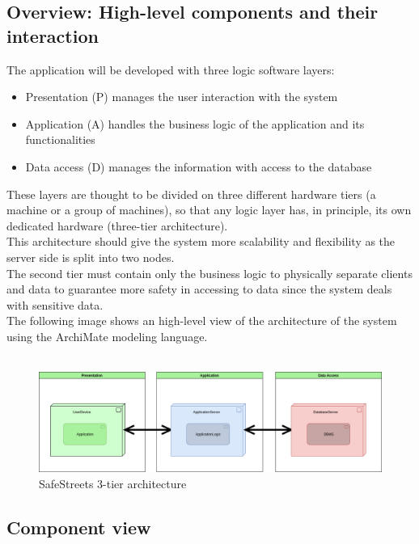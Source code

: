 \documentclass{article}
\begin{document}
\subsection{Overview: High-level components and their interaction}
\label{sec:Overview}
The application will be developed with three logic software layers: 
\begin{itemize}
	\item Presentation (P) manages the user interaction with the system 
	\item Application (A) handles the business logic of the application and its functionalities 
	\item Data access (D) manages the information with access to the database
\end{itemize}
These layers are thought to be divided on three different hardware tiers (a machine or a group of machines), so that any logic layer has, in principle, its own dedicated hardware (three-tier architecture).\\
This architecture should give the system more scalability and flexibility as the server side is split into two nodes.\\
The second tier must contain only the business logic to physically separate clients and data to guarantee more safety in accessing to data since the system deals with sensitive data. \\
The following image shows an high-level view of the architecture of the system using the ArchiMate modeling language.\\
\\
\begin{figure}[ht]
\centering
	\includegraphics[width=1.0\textwidth]{images/tier-structure.png}
	\caption{SafeStreets 3-tier architecture}
	\label{fig:tier-structure}
\end{figure}

\newpage

\subsection{Component view}
\end{document}
